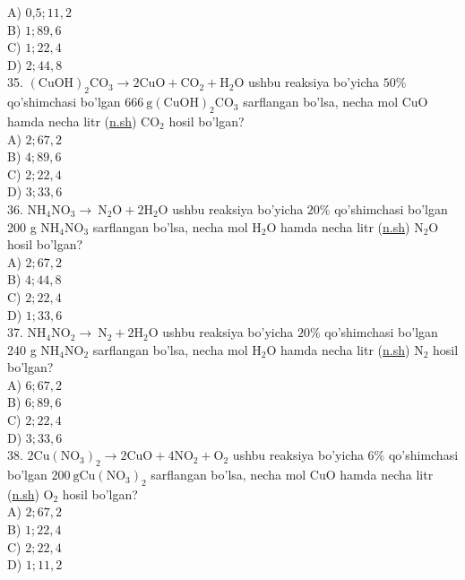 A) 0,$5 ; 11,2$\\
B) $1 ; 89,6$\\
C) $1 ; 22,4$\\
D) $2 ; 44,8$\\
35. $(\mathrm{CuOH})_{2} \mathrm{CO}_{3} \rightarrow 2 \mathrm{CuO}+\mathrm{CO}_{2}+\mathrm{H}_{2} \mathrm{O}$ ushbu reaksiya bo'yicha $50 \%$ qo'shimchasi bo'lgan $666 \mathrm{~g}(\mathrm{CuOH})_{2} \mathrm{CO}_{3}$ sarflangan bo'lsa, necha mol CuO hamda necha litr (\href{http://n.sh}{n.sh}) $\mathrm{CO}_{2}$ hosil bo'lgan?\\
A) $2 ; 67,2$\\
B) $4 ; 89,6$\\
C) $2 ; 22,4$\\
D) $3 ; 33,6$\\
36. $\mathrm{NH}_{4} \mathrm{NO}_{3} \rightarrow \mathrm{~N}_{2} \mathrm{O}+2 \mathrm{H}_{2} \mathrm{O}$ ushbu reaksiya bo'yicha $20 \%$ qo'shimchasi bo'lgan 200 g $\mathrm{NH}_{4} \mathrm{NO}_{3}$ sarflangan bo'lsa, necha mol $\mathrm{H}_{2} \mathrm{O}$ hamda necha litr (\href{http://n.sh}{n.sh}) $\mathrm{N}_{2} \mathrm{O}$ hosil bo'lgan?\\
A) $2 ; 67,2$\\
B) $4 ; 44,8$\\
C) $2 ; 22,4$\\
D) $1 ; 33,6$\\
37. $\mathrm{NH}_{4} \mathrm{NO}_{2} \rightarrow \mathrm{~N}_{2}+2 \mathrm{H}_{2} \mathrm{O}$ ushbu reaksiya bo'yicha $20 \%$ qo'shimchasi bo'lgan 240 g $\mathrm{NH}_{4} \mathrm{NO}_{2}$ sarflangan bo'lsa, necha mol $\mathrm{H}_{2} \mathrm{O}$ hamda necha litr (\href{http://n.sh}{n.sh}) $\mathrm{N}_{2}$ hosil bo'lgan?\\
A) $6 ; 67,2$\\
B) $6 ; 89,6$\\
C) $2 ; 22,4$\\
D) $3 ; 33,6$\\
38. $2 \mathrm{Cu}\left(\mathrm{NO}_{3}\right)_{2} \rightarrow 2 \mathrm{CuO}+4 \mathrm{NO}_{2}+\mathrm{O}_{2}$ ushbu reaksiya bo'yicha $6 \%$ qo'shimchasi bo'lgan $200 \mathrm{~g} \mathrm{Cu}\left(\mathrm{NO}_{3}\right)_{2}$ sarflangan bo'lsa, necha mol CuO hamda necha litr (\href{http://n.sh}{n.sh}) $\mathrm{O}_{2}$ hosil bo'lgan?\\
A) $2 ; 67,2$\\
B) $1 ; 22,4$\\
C) $2 ; 22,4$\\
D) $1 ; 11,2$\\

